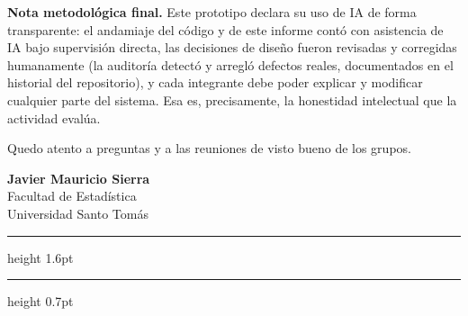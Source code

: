 \documentclass[11pt,letterpaper]{article}
\newcommand{\fileteInstitucional}{%
  {\color{ustaAzul}\hrule height 1.6pt}%
  \vspace{1.6pt}%
  {\color{ustaDorado}\hrule height 0.7pt}%
}
\begin{document}
\textbf{Nota metodológica final.} Este prototipo declara su uso de IA de forma transparente: el
andamiaje del código y de este informe contó con asistencia de IA bajo supervisión directa, las
decisiones de diseño fueron revisadas y corregidas humanamente (la auditoría detectó y arregló defectos
reales, documentados en el historial del repositorio), y cada integrante debe poder explicar y modificar
cualquier parte del sistema. Esa es, precisamente, la honestidad intelectual que la actividad evalúa.

\vspace{16pt}
Quedo atento a preguntas y a las reuniones de visto bueno de los grupos.

\vspace{20pt}
\textbf{Javier Mauricio Sierra}\\
{\color{grisTexto}Facultad de Estadística\\Universidad Santo Tomás}

\vspace{14pt}
\fileteInstitucional
\end{document}
